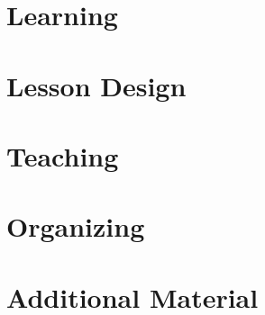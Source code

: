 \documentclass[9pt,statementpaper]{memoir}
\begin{document}




\part{Learning}





\part{Lesson Design}



\part{Teaching}






\part{Organizing}








\part{Additional Material}

\appendix














\end{document}
